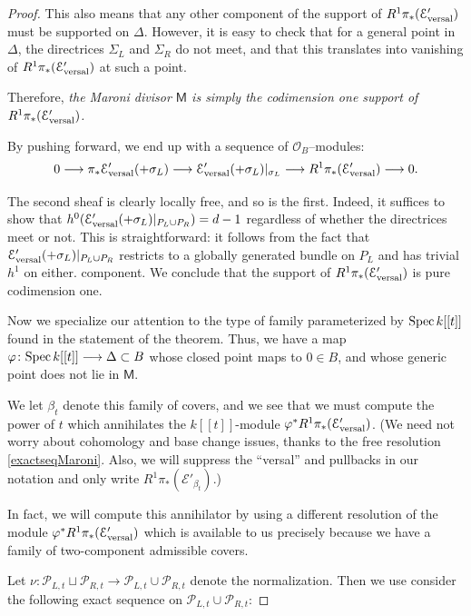 \documentclass[reqno, 10 pt]{article}
\theoremstyle{definition}
\theoremstyle{remark}
\numberwithin{equation}{section}
\numberwithin{thm}{section}
\numberwithin{prop}{section}
\numberwithin{lem}{section}
\numberwithin{cor}{section}
\numberwithin{conj}{section}
\numberwithin{defn}{section}
\renewcommand{\to}{\longrightarrow}
\newcommand{\sfM}{{\mathsf M}}
\newcommand{\cE}{{\mathcal E}}
\newcommand{\cO}{{\mathcal O}}
\newcommand{\cP}{{\mathcal P}}
\newcommand {\from}{{\colon}}
\newcommand{\Spec}{{\text{\rm Spec}\,}}
\begin{document}
\begin{proof}
This also means that any other component of the support of $R^{1}\pi_{*}(\cE'_{{\rm versal}})$ must be supported on $\Delta$.  However, it is easy to check that for a general point in $\Delta$, the directrices $\Sigma_{L}$ and $\Sigma_{R}$ do not meet, and that this translates into vanishing of $R^{1}\pi_{*}(\cE'_{{\rm versal}})$ at such a point. 

Therefore, {\sl the Maroni divisor $\sfM$ is simply the codimension one support of $R^{1}\pi_{*}(\cE'_{{\rm versal}})$.}


By pushing forward, we end up with a sequence of $\cO_{B}$--modules:
\begin{equation}\label{exactseqMaroni}
0 \to \pi_{*}\cE'_{{\rm versal}}(+\sigma_{L}) \to \cE'_{{\rm versal}}(+\sigma_{L})|_{\sigma_{L}} \to R^{1}\pi_{*}(\cE'_{{\rm versal}}) \to 0.
\end{equation}

The second sheaf is clearly locally free, and so is the first.  Indeed, it suffices to show that $h^{0}(\cE'_{{\rm versal}}(+\sigma_{L})|_{P_{L}\cup P_{R}}) = d-1$ regardless of whether the directrices meet or not. This is straightforward: it follows from the fact that $\cE'_{{\rm versal}}(+\sigma_{L})|_{P_{L}\cup P_{R}}$ restricts to a globally generated bundle on $P_{L}$ and has trivial $h^{1}$ on either. component.  We conclude that the support of $R^{1}\pi_{*}(\cE'_{{\rm versal}})$ is pure codimension one.

Now we specialize our attention to the type of family parameterized by $\Spec k[[t]]$ found in the statement of the theorem. Thus, we have a map $\varphi \from \Spec k[[t]] \to \Delta \subset B$ whose closed point maps to $0 \in B$, and whose generic point does not lie in $\sfM$. 

We let $\beta_{t}$ denote this family of covers, and we see that we must compute the power of $t$ which annihilates the $k[[t]]$-module $\varphi^{*} R^{1}\pi_{*}(\cE'_{{\rm versal}})$. (We need not worry about cohomology and base change issues, thanks to the free resolution \ref{exactseqMaroni}. Also, we will suppress the ``versal'' and pullbacks in our notation and only write $R^{1}\pi_{*}(\cE'_{\beta_{t}}).$)

In fact, we will compute this annihilator by using a different resolution of the module $\varphi^{*} R^{1}\pi_{*}(\cE'_{{\rm versal}})$ which is available to us precisely because we have a family of two-component admissible covers.  

Let $\nu \from \cP_{L,t} \sqcup \cP_{R,t} \to \cP_{L,t} \cup \cP_{R,t}$ denote the normalization. Then we use consider the following exact sequence on $\cP_{L,t} \cup \cP_{R,t}$: 


\end{proof}
\end{document}
